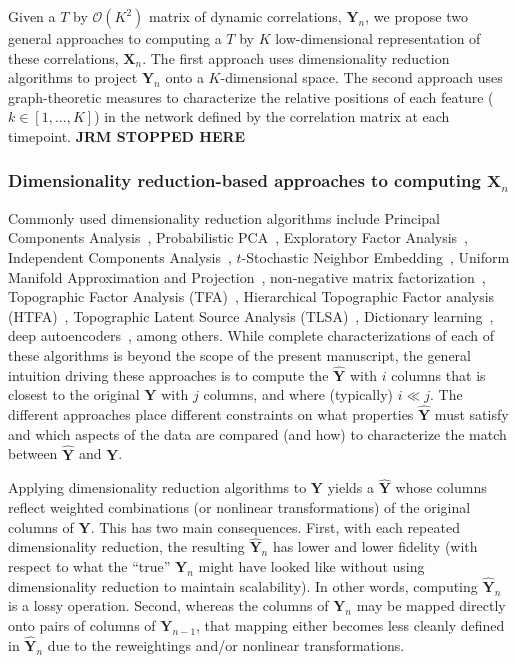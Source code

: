 \documentclass[english]{article}
\begin{document}
Given a $T$ by $\mathcal{O}(K^2)$ matrix of dynamic correlations,
$\mathbf{Y}_n$, we propose two general approaches to computing a $T$ by $K$
low-dimensional representation of these correlations, $\mathbf{X}_n$.
The first approach uses dimensionality reduction algorithms to project
$\mathbf{Y}_n$ onto a $K$-dimensional space.  The second approach uses
graph-theoretic measures to characterize the relative positions of
each feature ($k \in \left[1, ..., K \right]$) in the network defined
by the correlation matrix at each timepoint. \textbf{JRM STOPPED HERE}

\subsubsection*{Dimensionality reduction-based approaches to computing
  $\mathbf{X}_n$}

Commonly used dimensionality reduction algorithms include Principal
Components Analysis~\citep[PCA; ][]{Pear01}, Probabilistic
PCA~\citep[PPCA; ][]{TippBish99}, Exploratory Factor
Analysis~\citep[EFA; ][]{Spea04}, Independent Components
Analysis~\citep[ICA; ][]{JuttHera91, ComoEtal91}, $t$-Stochastic
Neighbor Embedding~\citep[$t$-SNE; ][]{MaatHint08}, Uniform Manifold
Approximation and Projection~\citep[UMAP; ][]{McInHeal18},
non-negative matrix factorization~\citep[NMF; ][]{LeeSeun99},
Topographic Factor Analysis (TFA)~\cite{MannEtal14b}, Hierarchical
Topographic Factor analysis (HTFA)~\cite{MannEtal18}, Topographic
Latent Source Analysis (TLSA)~\cite{GersEtal11}, Dictionary
learning~\citep{MairEtal09a, MairEtal09b}, deep
autoencoders~\citep{HintSala06}, among others.  While complete
characterizations of each of these algorithms is beyond the scope of
the present manuscript, the general intuition driving these
approaches is to compute the $\hat{\mathbf{Y}}$ with $i$ columns that
is closest to the original $\mathbf{Y}$ with $j$ columns, and where
(typically) $i \ll j$.  The different approaches place different
constraints on what properties $\hat{\mathbf{Y}}$ must satisfy and
which aspects of the data are compared (and how) to characterize the
match between $\hat{\mathbf{Y}}$ and  $\mathbf{Y}$.

Applying dimensionality reduction algorithms to $\mathbf{Y}$ yields a
$\hat{\mathbf{Y}}$ whose columns reflect weighted combinations (or
nonlinear transformations) of the original columns of $\mathbf{Y}$.
This has two main consequences.  First, with each repeated
dimensionality reduction, the resulting $\hat{\mathbf{Y}}_n$ has lower
and lower fidelity (with respect to what the ``true'' $\mathbf{Y}_n$
might have looked like without using dimensionality reduction to
maintain scalability).  In other words, computing $\hat{\mathbf{Y}}_n$
is a lossy operation.  Second, whereas the columns of $\mathbf{Y}_n$
may be mapped directly onto pairs of columns of $\mathbf{Y}_{n-1}$,
that mapping either becomes less cleanly defined in
$\hat{\mathbf{Y}}_n$ due to the reweightings and/or nonlinear
transformations.
\end{document}
